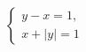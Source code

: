 \begin{ex}
	\begin{condition}
		\( \left\{
		\begin{array}{l}
			y-x=1,\\
			x+|y|=1
		\end{array}
		\right. \)
	\end{condition}
\end{ex}